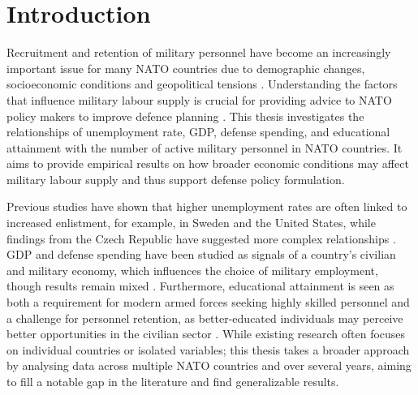 \chapter{Introduction}

Recruitment and retention of military personnel have become an increasingly 
important issue for many NATO countries due to demographic changes, socioeconomic 
conditions and geopolitical tensions \parencite{nato_research_and_technology_organization_recruiting_2007,nato_nato_2022}.
Understanding the factors that influence military labour supply is crucial for providing 
advice to NATO policy makers to improve defence planning \parencite{nato_research_and_technology_organization_recruiting_2007}.
This thesis investigates the relationships of
unemployment rate, GDP, defense spending, and educational attainment with
the number of active military personnel in NATO countries.
It aims to provide empirical results on how broader economic conditions 
may affect military labour supply and thus support defense policy formulation.

Previous studies have shown that higher unemployment rates are often 
linked to increased enlistment, for example, in Sweden and the United States, 
while findings from the Czech Republic have suggested more complex relationships
\parencite{backstrom_are_2019,asch_cash_2010,holcner_military_2021}. 
GDP and defense spending have been studied as signals of a country’s 
civilian and military economy, which influences the choice of military employment, 
though results remain mixed \parencite{warner_chapter_1995,holcner_military_2021}. 
Furthermore, educational attainment is seen as both a requirement for modern armed forces seeking highly skilled personnel 
and a challenge for personnel retention, as better-educated individuals may perceive better 
opportunities in the civilian sector
\parencite{cnas_resources_and_force_readiness_division_fiscal_nodate,hof_quality_2023}. 
While existing research 
often focuses on individual countries or isolated variables; this thesis takes a 
broader approach by analysing data across multiple NATO countries and over several years, 
aiming to fill a notable gap in the literature and find generalizable results.